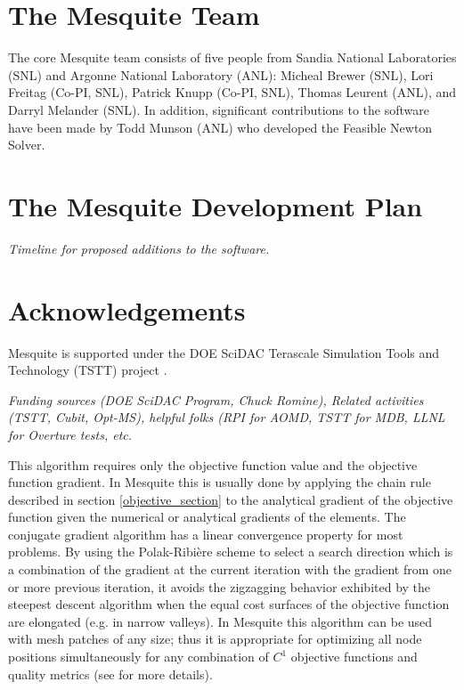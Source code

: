 \documentclass[psfig]{article}
\begin{document}
\section{The Mesquite Team}

The core Mesquite team consists of five people from Sandia
National Laboratories (SNL) and Argonne National Laboratory (ANL):
Micheal Brewer (SNL), Lori Freitag (Co-PI, SNL), Patrick Knupp (Co-PI, SNL), 
Thomas Leurent (ANL), and Darryl Melander (SNL).  In addition,
significant contributions to the software have been made by
Todd Munson (ANL) who developed the Feasible Newton Solver.

\section{The Mesquite Development Plan}

{\it Timeline for proposed additions to the software.}

\section{Acknowledgements}

Mesquite is supported under the DOE SciDAC Terascale Simulation 
Tools and Technology (TSTT) project \cite{tstt}.  

{\it Funding sources (DOE SciDAC Program, Chuck Romine), Related activities
(TSTT, Cubit, Opt-MS), helpful folks (RPI for AOMD, TSTT for MDB, LLNL
for Overture tests, etc.}






\newpage
{} \newline
\label{append_A}
This algorithm requires only
the objective function value and the objective function gradient. 
In Mesquite this is usually done by applying the chain rule described in 
section \ref{objective_section} to the
analytical gradient of the objective function given the numerical or
analytical gradients of the elements. The conjugate gradient algorithm
has a linear convergence property for most problems. By using the
Polak-Ribi\`ere scheme to select a search direction which is a
combination of the gradient at the current iteration with the gradient
from one or more previous iteration, it avoids the zigzagging behavior
exhibited by the steepest descent algorithm when the equal cost
surfaces of the objective function are elongated (e.g. in narrow
valleys). In Mesquite this algorithm can be used with mesh patches of
any size; thus it is appropriate for optimizing all node positions 
simultaneously for any combination of $C^1$ objective functions and
quality metrics (see \cite{FeasNewt} for more details). 
\end{document}
